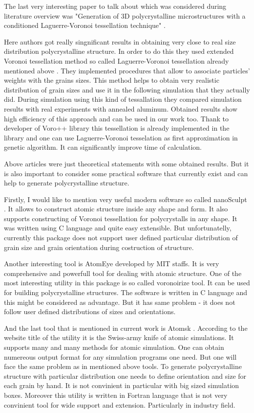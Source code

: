 \documentclass[12pt]{report}
\begin{document}
The last very interesting paper to talk about which was considered during literature overview was "Generation of 3D polycrystalline microstructures with a conditioned Laguerre-Voronoi tessellation technique" \cite{falco15}.

Here authors got really singnificant results in obtaining very close to real size distribution polycrystalline structure. In order to do this they used extended Voronoi tessellation method so called Laguerre-Voronoi tessellation already mentioned above \cite{fan04}. They implemented procedures that allow to associate particles' weights with the grains sizes. This method helps to obtain very realistic distribution of grain sizes and use it in the following simulation that they actually did. During simulation using this kind of tessallation they compared simulation results with real experiments with annealed aluminum. Obtained results show high efficiency of this approach and can be used in our work too. Thank to developer of Voro++ library this tessellation is already implemented in the library and one can use Laguerre-Voronoi tesselation as first approximation in genetic algorithm. It can significantly improve time of calculation.

Above articles were just theoretical statements with some obtained results. But it is also important to consider some practical software that currently exist and can help to generate polycrystalline structure.

Firstly, I would like to mention very useful modern software so called nanoSculpt \cite{prak16}. It allows to construct atomic structure inside any shape and form. It also supports constructing of Voronoi tessellation for polycrystalls in any shape. It was written using C language and quite easy extensible. But unfortunatelly, currently this package does not support user defined particular distribution of grain size and grain orientation during costruction of structure. 

Another interesting tool is AtomEye \cite{juli03} developed by MIT staffs. It is very comprehensive and powerfull tool for dealing with atomic structure. One of the most interesting utility in this package is so called voronoirize tool. It can be used for building polycrystalline structures. The software is written in C language and this might be considered as advantage. But it has same problem - it does not follow user defined distributions of sizes and orientations. 

And the last tool that is mentioned in current work is Atomsk \cite{hirel15}. According to the website title of the utility it is the Swiss-army knife of atomic simulations. It supports many and many methods for atomic simulation. One can obtain numereous output format for any simulation programs one need. But one will face the same problem as in mentioned above tools. To generate polycrystalline structure with particular distribution one needs to define orientation and size for each grain by hand. It is not convinient in particular with big sized simulation boxes. Moreover this utility is written in Fortran language that is not very convinient tool for wide support and extension. Particularly in industry field.
\end{document}
